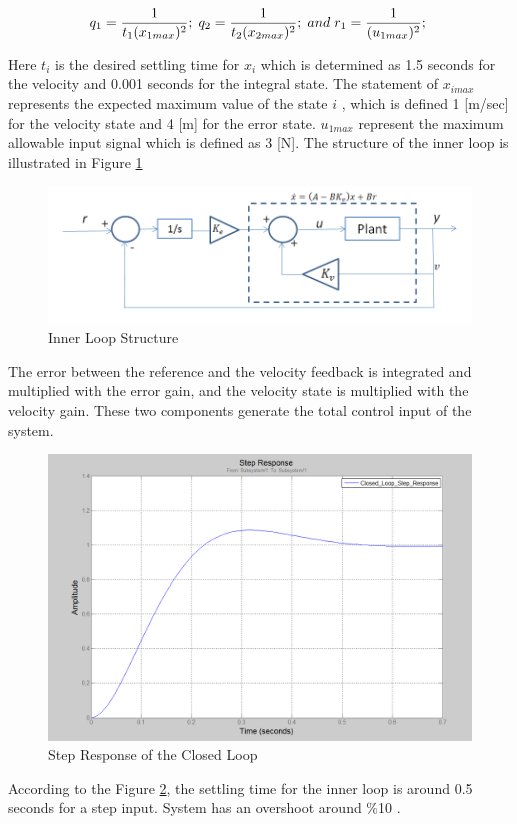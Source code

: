 \begin{equation}
q_1 = \frac{1}{t_1 (x_{1max})^2}; \hspace{0.1cm}
q_2 = \frac{1}{t_2 (x_{2max})^2}; \hspace{0.1cm} and \hspace{0.1cm}
r_1 = \frac{1}{ (u_{1max})^2}; \hspace{0.1cm}
\end{equation}

Here $t_i$  is the desired settling time for $x_i$ which is determined as 1.5 seconds for the velocity and 0.001 seconds for the integral state. The statement of $x_{imax}$ represents the expected maximum value of the state $i$ , which is defined 1 [m/sec] for the velocity state and 4 [m] for the error state. $u_{1max}$ represent the maximum allowable input signal which is defined as 3 [N]. The structure of the inner loop is illustrated in Figure \ref{innerloopref}

\begin{figure}[H]
\caption{Inner Loop Structure} \label{innerloopref}
\centering
\includegraphics[scale = 0.50]{inner_loop}
\end{figure}

The error between the reference and the velocity feedback is integrated and multiplied with the error gain, and the velocity state is multiplied with the velocity gain. These two components generate the total control input of the system.  

\begin{figure}[H]
\caption{Step Response of the Closed Loop} \label{Stepresp}
\centering
\includegraphics[scale = 0.40]{step_resp}
\end{figure}

According to the Figure \ref{Stepresp}, the settling time for the inner loop is around 0.5 seconds for a step input. System has an overshoot around $\%$10 .